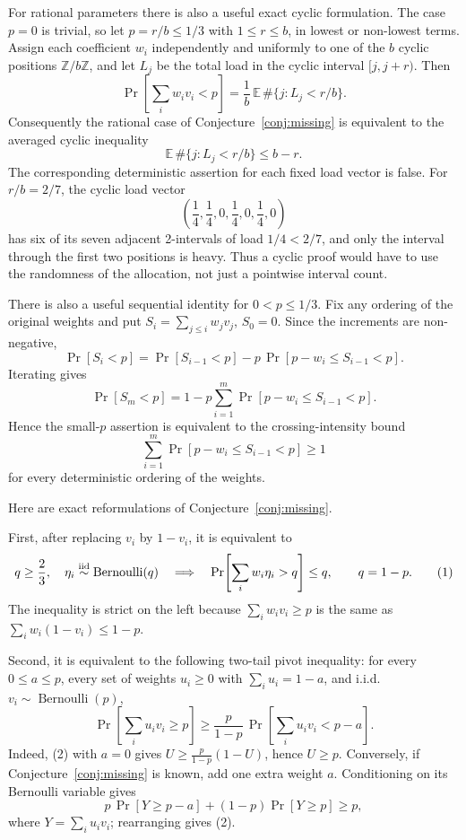 \documentclass[12pt]{article}
\newcommand{\Ber}{\operatorname{Bernoulli}}
\begin{document}
For rational parameters there is also a useful exact cyclic formulation.  The
case \(p=0\) is trivial, so let \(p=r/b\le1/3\) with \(1\le r\le b\), in
lowest or non-lowest terms.  Assign each coefficient \(w_i\)
independently and uniformly to one of the \(b\) cyclic positions
\(\mathbb Z/b\mathbb Z\), and let \(L_j\) be the total load in the cyclic
interval \([j,j+r)\).  Then
\[
        \Pr\!\left[\sum_i w_i v_i<p\right]
        =\frac1b\,\mathbb E\,\#\{j:L_j<r/b\}.              \tag{8}
\]
Consequently the rational case of Conjecture~\ref{conj:missing} is equivalent
to the averaged cyclic inequality
\[
        \mathbb E\,\#\{j:L_j<r/b\}\le b-r .                \tag{9}
\]
The corresponding deterministic assertion for each fixed load vector is false.
For \(r/b=2/7\), the cyclic load vector
\[
   \left(\frac14,\frac14,0,\frac14,0,\frac14,0\right)
\]
has six of its seven adjacent 2-intervals of load \(1/4<2/7\), and only the
interval through the first two positions is heavy.  Thus a cyclic proof would
have to use the randomness of the allocation, not just a pointwise interval
count.

There is also a useful sequential identity for \(0<p\le1/3\).  Fix any ordering
of the original weights and put \(S_i=\sum_{j\le i}w_jv_j\), \(S_0=0\).  Since
the increments are non-negative,
\[
 \Pr[S_i<p]=\Pr[S_{i-1}<p]
      -p\,\Pr[p-w_i\le S_{i-1}<p].
\]
Iterating gives
\[
 \Pr[S_m<p]
   =1-p\sum_{i=1}^m\Pr[p-w_i\le S_{i-1}<p].              \tag{10}
\]
Hence the small-\(p\) assertion is equivalent to the crossing-intensity bound
\[
        \sum_{i=1}^m\Pr[p-w_i\le S_{i-1}<p]\ge1
\]
for every deterministic ordering of the weights.

Here are exact reformulations of Conjecture~\ref{conj:missing}.

First, after replacing \(v_i\) by \(1-v_i\), it is equivalent to
\[
   q\ge\frac23,\quad \eta_i\stackrel{\rm iid}{\sim}\Ber(q)
   \quad\Longrightarrow\quad
   \Pr\!\left[\sum_i w_i\eta_i>q\right]\le q ,
   \qquad q=1-p .                                      \tag{1}
\]
The inequality is strict on the left because
\(\sum_i w_i v_i\ge p\) is the same as
\(\sum_iw_i(1-v_i)\le1-p\).

Second, it is equivalent to the following two-tail pivot inequality: for every
\(0\le a\le p\), every set of weights \(u_i\ge0\) with
\(\sum_i u_i=1-a\), and i.i.d.\ \(v_i\sim\Ber(p)\),
\[
   \Pr\!\left[\sum_i u_i v_i\ge p\right]
   \ge
   \frac{p}{1-p}\,
   \Pr\!\left[\sum_i u_i v_i<p-a\right].                 \tag{2}
\]
Indeed, (2) with \(a=0\) gives
\(U\ge\frac{p}{1-p}(1-U)\), hence \(U\ge p\).  Conversely, if
Conjecture~\ref{conj:missing} is known, add one extra weight \(a\).  Conditioning on
its Bernoulli variable gives
\[
 p\,\Pr[Y\ge p-a]+(1-p)\Pr[Y\ge p]\ge p,
\]
where \(Y=\sum_i u_i v_i\); rearranging gives (2).
\end{document}
